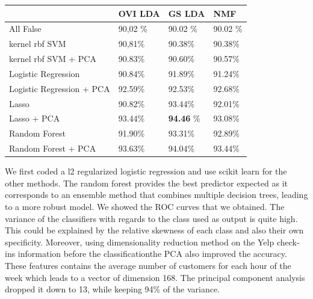 \documentclass[paper=a4, fontsize=11pt]{scrartcl} %
\numberwithin{equation}{section}
\numberwithin{figure}{section}
\numberwithin{table}{section}
\begin{document}
\begin{center}
    \begin{tabular}{| l | l | l | l |}
    \hline
    & OVI LDA & GS LDA & NMF \\ \hline
    All False & 90,02 \% &  90.02 \% &  90.02 \% \\ \hline
    kernel rbf SVM & 90,81\% &  90.38\% &  90.38\% \\ \hline
    kernel rbf SVM + PCA & 90.83\% &  90.60\% &  90.57\% \\ \hline
    Logistic Regression & 90.84\% &  91.89\%  &  91.24\%\\ \hline
    Logistic Regression + PCA & 92.59\% &  92.53\% &  92.68\% \\ \hline
    Lasso & 90.82\% &  93.44\% &  92.01\% \\ \hline
	Lasso + PCA & 93.44\%  &  \textbf{94.46} \%  &  93.08\% \\ \hline
    Random Forest & 91.90\% &  93.31\% &  92.89\% \\ \hline
    Random Forest + PCA & 93.63\% &  94.04\% &  93.44\% \\ \hline
    \end{tabular}
\end{center}

We first coded a l2 regularized logistic regression and use scikit learn for the other methods. The random forest provides the best predictor expected as it corresponds to an ensemble method that combines multiple decision trees, leading to a more robust model. We showed the ROC curves that we obtained. The variance of the classifiers with regards to the class used as output is quite high. This could be explained by the relative skewness of each class and also their own specificity. Moreover, using dimensionality reduction method on the Yelp check-ins information before the classificationthe PCA also improved the accuracy. These features contains the average number of customers for each hour of the week which leads to a vector of dimension 168. The principal component analysis dropped it down to 13, while keeping 94\% of the variance.
\end{document}

